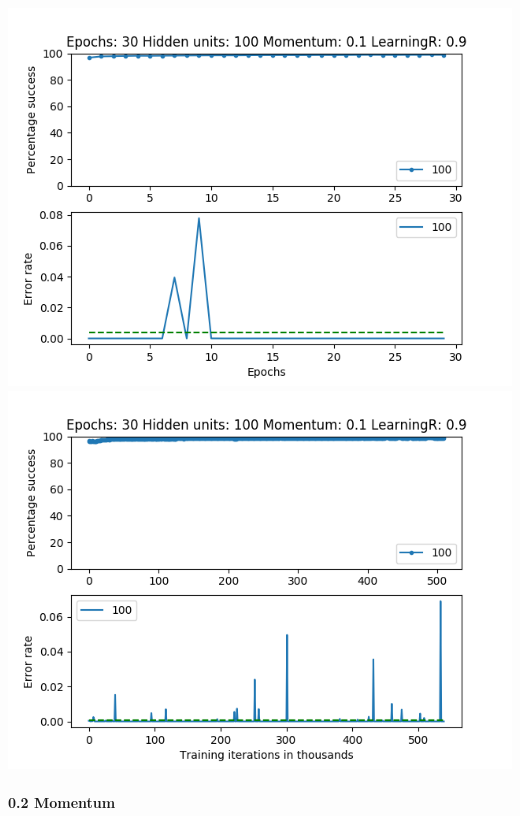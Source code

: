 \documentclass[11pt]{article}
\makeatletter
\def\maxwidth{\ifdim\Gin@nat@width>\linewidth\linewidth
    \else\Gin@nat@width\fi}
\let\Oldincludegraphics\includegraphics
\renewcommand{\includegraphics}[1]{\Oldincludegraphics[width=.8\maxwidth]{#1}}
\makeatother
\begin{document}
\includegraphics{Experiment1/E1_NN_Epoch_Momentum_0.1_30Epochs_100_LR_0.9_Hiddenunits.png}
\includegraphics{Experiment1/E1_NN_Training_Momentum_0.1_30Epochs_100_LR_0.9_Hiddenunits.png}

\hypertarget{momentum-2}{%
\paragraph{0.2 Momentum}\label{momentum-2}}
\end{document}
